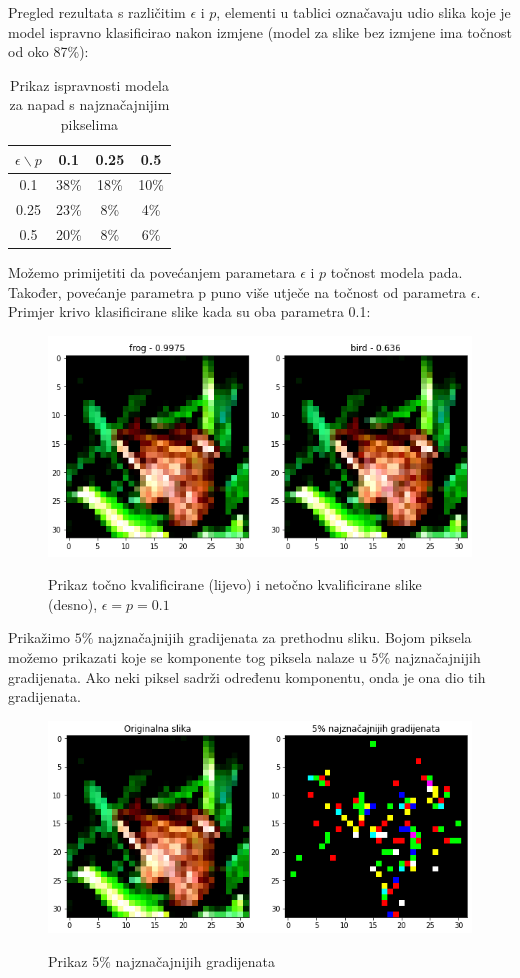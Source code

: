 Pregled rezultata s različitim $\epsilon$ i $p$, elementi u tablici označavaju udio slika koje je model ispravno klasificirao nakon izmjene (model za slike bez izmjene ima točnost od oko 87\%):

\begin{table}[H]
	\centering
	\begin{tabular}{||c || c c c||} 
		\hline
		$\epsilon \backslash p$ & 0.1 & 0.25 & 0.5 \\ [0.5ex] 
		\hline\hline
		0.1 & 38\% & 18\% & 10\% \\ 
		0.25 & 23\% & 8\% & 4\% \\
		0.5 & 20\% & 8\% & 6\% \\ [1ex] 
		\hline
	\end{tabular}
	\caption{Prikaz ispravnosti modela za napad s najznačajnijim pikselima}
\end{table}

Možemo primijetiti da povećanjem parametara $\epsilon$ i $p$ točnost modela pada. Također, povećanje parametra p puno više utječe na točnost od parametra $\epsilon$. Primjer krivo klasificirane slike kada su oba parametra 0.1:
\begin{figure}[H]
	\centering
	{{\includegraphics[width=12cm]{slike/napadi/selected-grads-example.png} }}%
	\caption{Prikaz točno kvalificirane (lijevo) i netočno kvalificirane slike (desno), $\epsilon = p = 0.1$}%
	\label{fig:example}%
\end{figure}

Prikažimo $5\%$ najznačajnijih gradijenata za prethodnu sliku. Bojom piksela možemo prikazati koje se komponente tog piksela nalaze u $5\%$ najznačajnijih gradijenata. Ako neki piksel sadrži određenu komponentu, onda je ona dio tih gradijenata.
\begin{figure}[H]
	\centering
	{{\includegraphics[width=12cm]{slike/napadi/selected-grads-visualisation.png} }}%
	\caption{Prikaz $5\%$ najznačajnijih gradijenata}%
	\label{fig:example}%
\end{figure}

